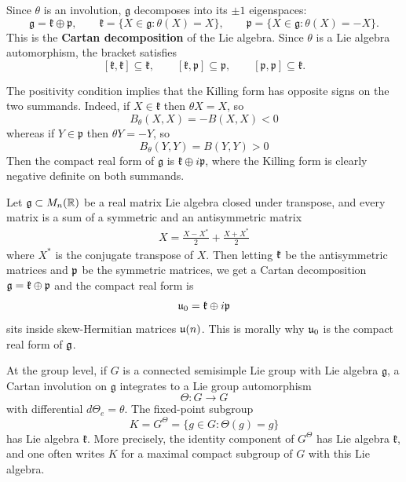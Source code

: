 \documentclass[12pt]{article}
\begin{document}
Since $\theta$ is an involution, $\mathfrak g$ decomposes into its $\pm 1$ eigenspaces:
\[
    \mathfrak g = \mathfrak k \oplus \mathfrak p,
    \qquad
    \mathfrak k = \{X \in \mathfrak g : \theta(X)=X\},
    \qquad
    \mathfrak p = \{X \in \mathfrak g : \theta(X)=-X\}.
\]
This is the \textbf{Cartan decomposition} of the Lie algebra. Since $\theta$ is a Lie algebra automorphism, the bracket satisfies
\[
    [\mathfrak k,\mathfrak k] \subseteq \mathfrak k,
    \qquad
    [\mathfrak k,\mathfrak p] \subseteq \mathfrak p,
    \qquad
    [\mathfrak p,\mathfrak p] \subseteq \mathfrak k.
\]

The positivity condition implies that the Killing form has opposite signs on the two summands. Indeed, if $X \in \mathfrak k$ then $\theta X = X$, so
\[
    B_\theta(X,X) = -B(X,X) < 0
\]
whereas if $Y \in \mathfrak p$ then $\theta Y = -Y$, so
\[
    B_\theta(Y,Y) = B(Y,Y) > 0
\]
Then the compact real form of $\mathfrak g$ is $\mathfrak k \oplus i\mathfrak p$, where the Killing form is clearly negative definite on both summands.

\begin{example}
    Let $\mathfrak{g} \subset M_n(\mathbb R)$ be a real matrix Lie algebra closed under transpose, and every matrix is a sum of a symmetric and an antisymmetric matrix \begin{align*}
        X = \frac{X-X^*}{2} + \frac{X+X^*}{2}
    \end{align*} where $X^*$ is the conjugate transpose of $X$. Then letting $\mathfrak{k}$ be the antisymmetric matrices and $\mathfrak{p}$ be the symmetric matrices, we get a Cartan decomposition $\mathfrak{g} = \mathfrak{k} \oplus \mathfrak{p}$ and the compact real form is \begin{align*}
        \mathfrak{u}_0 = \mathfrak{k} \oplus i\mathfrak{p}
    \end{align*} sits inside skew-Hermitian matrices $\mathfrak{u}(n)$. This is morally why $\mathfrak{u}_0$ is the compact real form of $\mathfrak{g}$.
\end{example}

At the group level, if $G$ is a connected semisimple Lie group with Lie algebra $\mathfrak g$, a Cartan involution on $\mathfrak g$ integrates to a Lie group automorphism
\[
    \Theta : G \to G
\]
with differential $d\Theta_e = \theta$. The fixed-point subgroup
\[
    K = G^\Theta = \{g \in G : \Theta(g)=g\}
\]
has Lie algebra $\mathfrak k$.
More precisely, the identity component of $G^\Theta$ has Lie algebra $\mathfrak k$, and one often writes $K$ for a maximal compact subgroup of $G$ with this Lie algebra.
\end{document}
